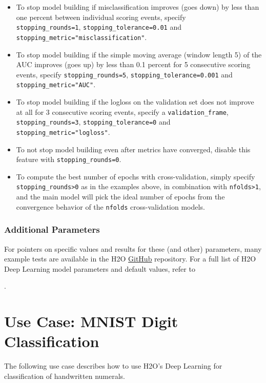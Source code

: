 {\begin{itemize}
\item To stop model building if misclassification improves (goes down) by less than one percent between individual scoring events, specify \\\texttt{stopping\_rounds=1}, \texttt{stopping\_tolerance=0.01} and \\\texttt{stopping\_metric="misclassification"}.
\item To stop model building if the simple moving average (window length 5) of the AUC improves (goes up) by less than 0.1 percent for 5 consecutive scoring events, specify \texttt{stopping\_rounds=5}, \texttt{stopping\_tolerance=0.001} and \texttt{stopping\_metric="AUC"}.
\item To stop model building if the logloss on the validation set does not improve at all for 3 consecutive scoring events, specify a \texttt{validation\_frame}, \texttt{stopping\_rounds=3}, \texttt{stopping\_tolerance=0} and \\\texttt{stopping\_metric="logloss"}.
\item To not stop model building even after metrics have converged, disable this feature with \texttt{stopping\_rounds=0}.
\item To compute the best number of epochs with cross-validation, simply specify \texttt{stopping\_rounds>0} as in the examples above, in combination with \texttt{nfolds>1}, and the main model will pick the ideal number of epochs from the convergence behavior of the \texttt{nfolds} cross-validation models.
\end{itemize}

\subsubsection{Additional Parameters}

For pointers on specific values and results for these (and other) parameters, many example tests are available in the H2O \href{https://github.com/h2oai/h2o-3/}{GitHub} repository. For a full list of H2O Deep Learning model parameters and default values, refer to {\textbf{}. 

\newpage
\section{Use Case: MNIST Digit Classification} 
The following use case describes how to use H2O's Deep Learning for classification of handwritten numerals. 

}}
